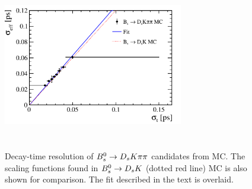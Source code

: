 \begin{figure}[h]
\includegraphics[height=7.4cm,width=0.7\textwidth]{figs/Resolution/ProperTimeReso_MC.pdf}
\caption{Decay-time resolution of ${{B}^0_{s}}\rightarrow{\ensuremath{{D}_{s}}}{\ensuremath{K}}{\ensuremath{\pi}}{\ensuremath{\pi}}$ candidates from MC. 
The scaling functions found in ${{B}^0_{s}}\rightarrow{\ensuremath{{D}_{s}}}{\ensuremath{K}}$ (dotted red line) MC is also shown for comparison. The fit described in the text is overlaid.}
\label{fig:ResoFit_compared}
\end{figure}



